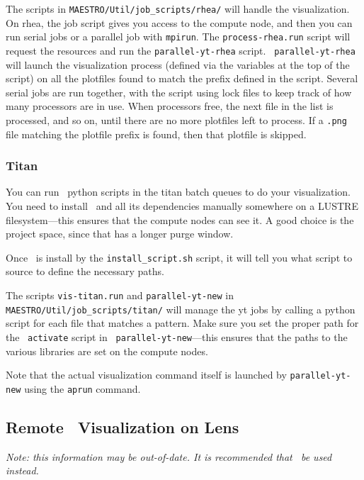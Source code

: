 The scripts in {\tt MAESTRO/Util/job\_scripts/rhea/} will handle the
visualization.  On rhea, the job script gives you access to the
compute node, and then you can run serial jobs or a parallel job with
{\tt mpirun}.  The {\tt process-rhea.run} script will request the
resources and run the {\tt parallel-yt-rhea} script.  {\tt
parallel-yt-rhea} will launch the visualization process (defined
via the variables at the top of the script) on all the plotfiles
found to match the prefix defined in the script.  Several serial
jobs are run together, with the script using lock files to keep track
of how many processors are in use.  When processors free, the next
file in the list is processed, and so on, until there are no more
plotfiles left to process.  If a {\tt .png} file matching the
plotfile prefix is found, then that plotfile is skipped.



\subsubsection{Titan}

You can run \yt\ python scripts in the titan batch queues to do your
visualization.  You need to install \yt\ and all its dependencies
manually somewhere on a LUSTRE filesystem---this ensures that the
compute nodes can see it.  A good choice is the project space, since
that has a longer purge window.

Once \yt\ is install by the {\tt install\_script.sh} script, it will
tell you what script to source to define the necessary paths.

The scripts {\tt vis-titan.run} and {\tt parallel-yt-new} in {\tt
MAESTRO/Util/job\_scripts/titan/} will manage the yt jobs by calling a
python script for each file that matches a pattern.  Make sure you set
the proper path for the \yt\ {\tt activate} script in {\tt
parallel-yt-new}---this ensures that the paths to the various libraries
are set on the compute nodes.

Note that the actual visualization command itself is launched by
{\tt parallel-yt-new} using the {\tt aprun} command.  


\subsection{Remote \visit\ Visualization on Lens}

{\em Note: this information may be out-of-date.  It is recommended that
 \yt\ be used instead.}

